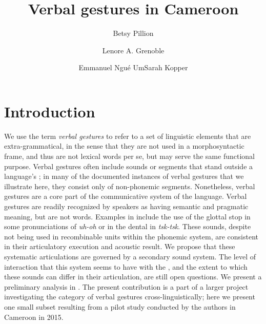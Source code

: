 \documentclass[output=paper,newtxmath,modfonts,nonflat,hidelinks]{langsci/langscibook}
\author{Betsy Pillion\affiliation{University of Chicago}\and Lenore A. Grenoble\affiliation{University of Chicago}\and Emmanuel Ngu{\'e} Um\affiliation{University of Yaound{\'e}}\lastand Sarah Kopper\affiliation{Michigan State University}}
\title{Verbal gestures in Cameroon}
\begin{document}
\maketitle

\section{Introduction}

We use the term \textit{verbal gestures} to refer to a set of linguistic elements that  are extra-grammatical, in the sense that they are not used in a morphosyntactic frame, and thus are not lexical words per se, but may serve the same functional purpose. Verbal gestures  often include sounds or segments that stand outside a language's ; in many of the documented instances of verbal gestures that we illustrate here, they consist only of non-phonemic segments. Nonetheless, verbal gestures are a core part of the communicative system of the language.  Verbal gestures are readily recognized by speakers as having semantic and pragmatic meaning, but are not words. Examples in  include the use of the glottal stop in some pronunciations of \textit{uh-oh} or in the dental  in \textit{tsk-tsk}. These sounds, despite not being used in recombinable units within the phonemic system, are consistent in their articulatory execution and acoustic result. We propose that these systematic articulations are governed by a secondary sound system. The level of interaction that this system seems to have with the , and the extent to which these sounds can differ in their articulation, are still open questions. We present a preliminary analysis in . The present contribution is a part of a larger project investigating the category of verbal gestures cross-linguistically; here we present one small subset resulting from a pilot study conducted by the authors in Cameroon in 2015.
\end{document}
